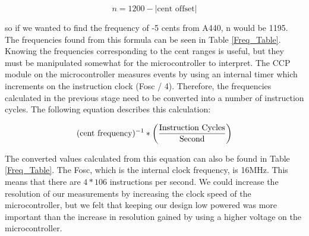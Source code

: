 \documentclass[12pt]{article}
\begin{document}
\begin{equation}
n = 1200 - |\mbox{cent offset}|
\end{equation}

so if we wanted to find the frequency of -5 cents from A440, n would be 1195. The frequencies found
from this formula can be seen in Table \ref{Freq_Table}. Knowing the frequencies corresponding to the cent ranges
is useful, but they must be manipulated somewhat for the microcontroller to interpret. The CCP module
on the microcontroller measures events by using an internal timer which increments on the instruction
clock (Fosc / 4). Therefore, the frequencies calculated in the previous stage need to be converted into a
number of instruction cycles. The following equation describes this calculation:

\begin{equation}
(\mbox{cent frequency})^{-1} * \left({ \mbox{Instruction Cycles} \over \mbox{Second}}\right)
\end{equation}

The converted values calculated from this equation can also be found in Table \ref{Freq_Table}. The Fosc, which is the
internal clock frequency, is 16MHz. This means that there are $4 *106$ instructions per second. We could
increase the resolution of our measurements by increasing the clock speed of the microcontroller, but
we felt that keeping our design low powered was more important than the increase in resolution gained
by using a higher voltage on the microcontroller.
\end{document}
